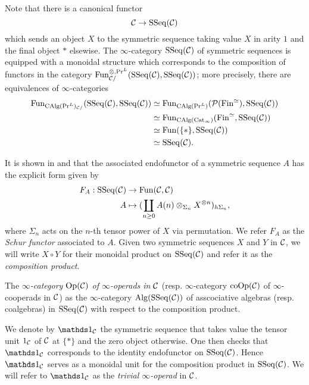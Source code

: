 \begin{remark}
Note that there is a canonical functor 
\[
{\mathcal{C}} \to \operatorname{SSeq}({\mathcal{C}})
\]
which sends an object $X$ to the symmetric sequence taking value $X$ in arity $1$ and the final object $*$ elsewise. 
The $\infty$-category $\operatorname{SSeq}({\mathcal{C}})$ of symmetric sequences is equipped with a monoidal structure which corresponds to the composition of functors in the category $\operatorname{Fun}_{{\mathcal{C}}/}^{\otimes,\Pr^{L}}(\operatorname{SSeq}({\mathcal{C}}),\operatorname{SSeq}({\mathcal{C}}))$; more precisely, there are equivalences of $\infty$-categories
\begin{align*}
	\operatorname{Fun}_{\operatorname{CAlg}(\Pr^L)_{{\mathcal{C}}/}}(\operatorname{SSeq}({\mathcal{C}}),\operatorname{SSeq}({\mathcal{C}}))
	& \simeq 
\operatorname{Fun}_{\operatorname{CAlg}(\Pr^L)}({\mathcal{P}}(\operatorname{Fin}^{\simeq}),\operatorname{SSeq}({\mathcal{C}}))\\
& \simeq
\operatorname{Fun}_{\operatorname{CAlg}(\operatorname{Cat}_{\infty})}(\operatorname{Fin}^{\simeq},\operatorname{SSeq}({\mathcal{C}}))\\
& \simeq \operatorname{Fun}(\{*\}, \operatorname{SSeq}({\mathcal{C}}))\\
& \simeq \operatorname{SSeq}({\mathcal{C}}).
\end{align*}
\end{remark}


It is shown in \cite{Haugsengsymseq} and \cite{BrantnerPhD} that the associated endofunctor of a symmetric sequence $A$ has the explicit form given by
\begin{align*}
		F_{A}: \operatorname{SSeq}({\mathcal{C}}) & \rightarrow \operatorname{Fun}({\mathcal{C}},{\mathcal{C}})\\
	A        & \mapsto     (\coprod_{n\geq 0} A(n)\otimes_{\Sigma_n} X^{\otimes n})_{h\Sigma_n},
\end{align*}
where $\Sigma_n$ acts on the $n$-th tensor power of $X$ via permutation.
We refer $F_{A}$ as the \emph{Schur functor} associated to $A$.
Given two symmetric sequences $X$ and $Y$ in ${\mathcal{C}}$, we will write $X\circ Y$ for their monoidal product on $\operatorname{SSeq}({\mathcal{C}})$ and refer it as the \emph{composition product}.


\begin{definition}
	\label{inf operads}
	The \emph{$\infty$-category $\operatorname{Op}({\mathcal{C}})$ of $\infty$-operads in ${\mathcal{C}}$} (resp. $\infty$-category $\operatorname{coOp}({\mathcal{C}})$ of $\infty$-cooperads in ${\mathcal{C}}$) as the $\infty$-category $\operatorname{Alg}(\operatorname{SSeq}({\mathcal{C}}))$ of asscociative algebras (resp. coalgebras) in $\operatorname{SSeq}({\mathcal{C}})$ with respect to the composition product.
\end{definition}

\begin{remark}
	We denote by $\triv_{\CC}$ the symmetric sequence that takes value the tensor unit $1_{\mathcal{C}}$ of ${\mathcal{C}}$ at $\{*\}$ and the zero object otherwise. One then checks that $\triv_{\CC}$ corresponds to the identity endofunctor on $\operatorname{SSeq}({\mathcal{C}})$. Hence $\triv_{\CC}$ serves as a monoidal unit for the composition product in $\operatorname{SSeq}({\mathcal{C}})$.
	We will refer to $\triv_{\CC}$ as the \emph{trivial $\infty$-operad} in ${\mathcal{C}}$.
\end{remark}


